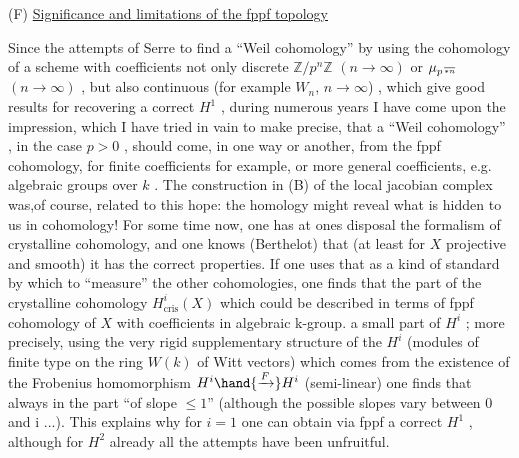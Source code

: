 
 (F) \uline{Significance and limitations of the fppf topology}

Since the attempts of Serre to find a ``Weil cohomology'' by using the
cohomology of a scheme with coefficients not only discrete $\mathbb{Z}/p^n\mathbb{Z}$ $(n \to \infty)$
 or $\mu_{p^{\over{\ast}{n}}}$ $(n \to \infty)$ , but also continuous (for example $W_n$, $n \to \infty$) , which
give good results for recovering a correct $H^1$ , during numerous years I
have come upon the impression, which I have tried in vain to make precise,
that a  ``Weil cohomology''\hand{,} , in the case $p > 0$ , should come, in
one way or another, from the fppf cohomology, for finite coefficients
for example, or more general coefficients, e.g. algebraic groups over $k$ .
The construction in (B) of the local jacobian complex was,of course, related
to this hope: the homology might reveal what is hidden to us in cohomology!
For some time now, one has at ones disposal the formalism of crystalline
cohomology, and one knows (Berthelot) that (at least for $X$ projective
and smooth) it has the correct properties. If one uses that as a kind of
standard by which to ``measure'' the other cohomologies, one finds that
the part of the crystalline cohomology $H^i_{\text{cris}}(X)$ which could be described in
terms of fppf cohomology of $X$ with coefficients in  algebraic k-group.
  a small part of $H^i$  ; more precisely, using the very rigid
supplementary structure of the $H^i$ (modules of finite type on the ring $W(k)$
of Witt vectors) which comes from the existence of the Frobenius homomorphism 
$H^i \hand{\xrightarrow{F}} H^i$ (semi-linear)\hand{,} one finds that   always in the part ``of slope
$\leq 1$'' (although the possible slopes vary between 0 and i ...). This explains
why for $i = 1$ one can obtain via fppf a correct $H^1$ , although for $H^2$
already all the attempts have been unfruitful.


